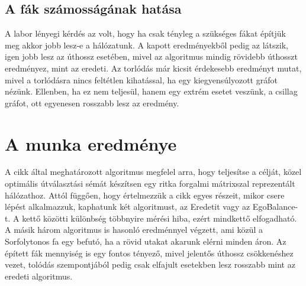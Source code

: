 \documentclass[12pt]{report}
\begin{document}
\subsection{A fák számosságának hatása}

A labor lényegi kérdés az volt, hogy ha csak tényleg a szükséges fákat építjük meg akkor jobb lesz-e a hálózatunk.
A kapott eredményekből pedig az látszik, igen jobb lesz az úthossz esetében, mivel az algoritmus mindig rövidebb úthosszt eredményez, mint az eredeti.
Az torlódás már kicsit érdekesebb eredményt mutat, mivel a torlódásra nincs feltétlen kihatással, ha egy kiegyensúlyozott gráfot nézünk.
Ellenben, ha ez nem teljesül, hanem egy extrém esetet veszünk, a csillag gráfot, ott egyenesen rosszabb lesz az eredmény.

\section{A munka eredménye}

A cikk által meghatározott algoritmus megfelel arra, hogy teljesítse a célját, közel optimális útválasztási sémát készítsen egy ritka forgalmi mátrixszal reprezentált hálózathoz.
Attól függően, hogy értelmezzük a cikk egyes részeit, mikor csere lépést alkalmazzuk, kaphatunk két algoritmust, az Eredetit vagy az EgoBalance-t.
A kettő közötti különbség többnyire mérési hiba, ezért mindkettő elfogadható.
A másik három algoritmus is hasonló eredménnyel végzett, ami közül a Sorfolytonos fa egy befutó, ha a rövid utakat akarunk elérni minden áron.
Az épített fák mennyiség is egy fontos tényező, mivel jelentős úthossz csökkenéshez vezet, tolódás szempontjából pedig csak elfajult esetekben lesz rosszabb mint az eredeti algoritmus.




	
\end{document}
